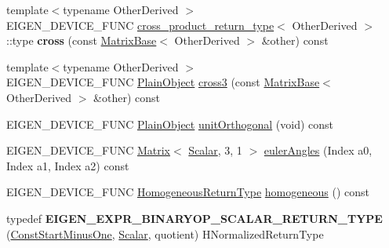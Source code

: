 \begin{DoxyCompactItemize}
\item 
\mbox{\label{class_eigen_1_1_matrix_base_a2e8833a03efd845d4ccdc3c49f3a1cc3}} 
{\footnotesize template$<$typename Other\+Derived $>$ }\\E\+I\+G\+E\+N\+\_\+\+D\+E\+V\+I\+C\+E\+\_\+\+F\+U\+NC \mbox{\hyperlink{struct_eigen_1_1_matrix_base_1_1cross__product__return__type}{cross\+\_\+product\+\_\+return\+\_\+type}}$<$ Other\+Derived $>$\+::type {\bfseries cross} (const \mbox{\hyperlink{class_eigen_1_1_matrix_base}{Matrix\+Base}}$<$ Other\+Derived $>$ \&other) const
\item 
{\footnotesize template$<$typename Other\+Derived $>$ }\\E\+I\+G\+E\+N\+\_\+\+D\+E\+V\+I\+C\+E\+\_\+\+F\+U\+NC \mbox{\hyperlink{class_eigen_1_1_dense_base_aae45af9b5aca5a9caae98fd201f47cc4}{Plain\+Object}} \mbox{\hyperlink{group___geometry___module_gaf10988c8393785423ae68a5afdf83226}{cross3}} (const \mbox{\hyperlink{class_eigen_1_1_matrix_base}{Matrix\+Base}}$<$ Other\+Derived $>$ \&other) const
\item 
E\+I\+G\+E\+N\+\_\+\+D\+E\+V\+I\+C\+E\+\_\+\+F\+U\+NC \mbox{\hyperlink{class_eigen_1_1_dense_base_aae45af9b5aca5a9caae98fd201f47cc4}{Plain\+Object}} \mbox{\hyperlink{group___geometry___module_ga2fd7a02d7bc4c339f0e97f12c09acb25}{unit\+Orthogonal}} (void) const
\item 
E\+I\+G\+E\+N\+\_\+\+D\+E\+V\+I\+C\+E\+\_\+\+F\+U\+NC \mbox{\hyperlink{class_eigen_1_1_matrix}{Matrix}}$<$ \mbox{\hyperlink{class_eigen_1_1_dense_base_a5feed465b3a8e60c47e73ecce83e39a2}{Scalar}}, 3, 1 $>$ \mbox{\hyperlink{group___geometry___module_ga24e8dc29689f0075ba5b1f90c02b76dc}{euler\+Angles}} (Index a0, Index a1, Index a2) const
\item 
E\+I\+G\+E\+N\+\_\+\+D\+E\+V\+I\+C\+E\+\_\+\+F\+U\+NC \mbox{\hyperlink{class_eigen_1_1_homogeneous}{Homogeneous\+Return\+Type}} \mbox{\hyperlink{group___geometry___module_ga8cd24704519bf35e1724e1915d477a35}{homogeneous}} () const
\item 
\mbox{\label{class_eigen_1_1_matrix_base_a4ef1d42e12b76ade7cb56dd3c2980f06}} 
typedef {\bfseries E\+I\+G\+E\+N\+\_\+\+E\+X\+P\+R\+\_\+\+B\+I\+N\+A\+R\+Y\+O\+P\+\_\+\+S\+C\+A\+L\+A\+R\+\_\+\+R\+E\+T\+U\+R\+N\+\_\+\+T\+Y\+PE} (\mbox{\hyperlink{class_eigen_1_1_block}{Const\+Start\+Minus\+One}}, \mbox{\hyperlink{class_eigen_1_1_dense_base_a5feed465b3a8e60c47e73ecce83e39a2}{Scalar}}, quotient) H\+Normalized\+Return\+Type

\end{DoxyCompactItemize}
